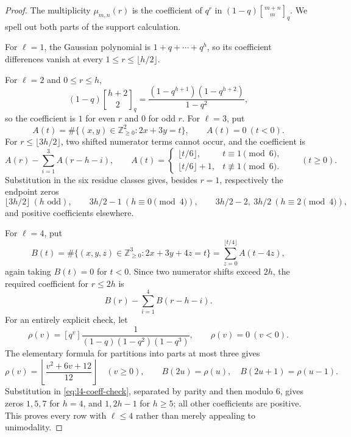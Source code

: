 \documentclass[11pt,reqno]{amsart}
\theoremstyle{definition}
\theoremstyle{remark}
\newcommand{\Z}{\mathbb Z}
\newcommand{\qbinom}[2]{\genfrac{[}{]}{0pt}{}{#1}{#2}}
\begin{document}
\begin{proof}
The multiplicity $\mu_{m,n}(r)$ is the coefficient of $q^r$ in
$(1-q)\qbinom{m+n}{m}_q$.  We spell out both parts of the support
calculation.

For $\ell=1$, the Gaussian polynomial is $1+q+\cdots+q^h$, so its
coefficient differences vanish at every $1\leq r\leq\lfloor h/2\rfloor$.

For $\ell=2$ and $0\leq r\leq h$,
\begin{equation*}
 (1-q)\qbinom{h+2}{2}_q
 =\frac{(1-q^{h+1})(1-q^{h+2})}{1-q^2},
\end{equation*}
so the coefficient is $1$ for even $r$ and $0$ for odd $r$.  For
$\ell=3$, put
\begin{equation*}
 A(t)=\#\{(x,y)\in\Z_{\geq0}^2:2x+3y=t\},\qquad A(t)=0\ (t<0).
\end{equation*}
For $r\leq\lfloor3h/2\rfloor$, two shifted numerator terms cannot occur, and
the coefficient is
\begin{equation}\label{eq:l3-coeff-check}
 A(r)-\sum_{i=1}^{3}A(r-h-i),
 \qquad
 A(t)=
 \begin{cases}
  \lfloor t/6\rfloor,&t\equiv1\pmod6,\\
  \lfloor t/6\rfloor+1,&t\not\equiv1\pmod6.
 \end{cases}\qquad(t\geq0).
\end{equation}
Substitution in the six residue classes gives, besides $r=1$, respectively
the endpoint zeros
\begin{equation*}
 \lfloor3h/2\rfloor\ (h\text{ odd}),\qquad
 3h/2-1\ (h\equiv0\!\!\pmod4),\qquad
 3h/2-2,\ 3h/2\ (h\equiv2\!\!\pmod4),
\end{equation*}
and positive coefficients elsewhere.

For $\ell=4$, put
\begin{equation*}
 B(t)=\#\{(x,y,z)\in\Z_{\geq0}^3:2x+3y+4z=t\}
      =\sum_{z=0}^{\lfloor t/4\rfloor}A(t-4z),
\end{equation*}
again taking $B(t)=0$ for $t<0$.  Since two numerator shifts exceed $2h$,
the required coefficient for $r\leq2h$ is
\begin{equation}\label{eq:l4-coeff-check}
 B(r)-\sum_{i=1}^{4}B(r-h-i).
\end{equation}
For an entirely explicit check, let
\begin{equation*}
 \rho(v)=[q^v]\frac1{(1-q)(1-q^2)(1-q^3)},\qquad \rho(v)=0\ (v<0).
\end{equation*}
The elementary formula for partitions into parts at most three gives
\begin{equation}\label{eq:rho-explicit}
 \rho(v)=\left\lfloor\frac{v^2+6v+12}{12}\right\rfloor\quad(v\geq0),
 \qquad
 B(2u)=\rho(u),\quad B(2u+1)=\rho(u-1).
\end{equation}
Substitution in \eqref{eq:l4-coeff-check}, separated by parity and then
modulo $6$, gives zeros $1,5,7$ for $h=4$, and $1,2h-1$ for $h\geq5$;
all other coefficients are positive.  This proves every row with
$\ell\leq4$ rather than merely appealing to unimodality.


\end{proof}
\end{document}
